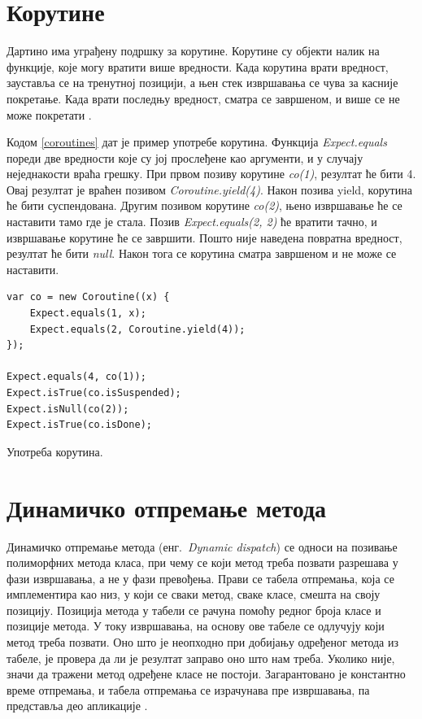 \documentclass[12pt,oneside]{memoir}
\begin{document}
\section{Корутине}
\label{korutine}

Дартино има уграђену подршку за корутине. Корутине су објекти налик на функције, које могу вратити више вредности. Када корутина врати вредност, зауставља се на тренутној позицији, а њен стек извршавања се чува за касније покретање. Када врати последњу вредност, сматра се завршеном, и више се не може покретати  \cite{korutine_i_vlakna}.

Кодом \ref{coroutines} дат је пример употребе корутина. Функција \textit{Expect.equals} пореди две вредности које су јој прослеђене као аргументи, и у случају неједнакости враћа грешку. При првом позиву корутине \textit{co(1)}, резултат ће бити 4. Овај резултат је враћен позивом \textit{Coroutine.yield(4)}. Након позива yield, корутина ће бити суспендована. Другим позивом корутине \textit{co(2)}, њено извршавање ће се наставити тамо где је стала. Позив \textit{Expect.equals(2, 2)} ће вратити тачно, и извршавање корутине ће се завршити. Пошто није наведена повратна вредност, резултат ће бити \textit{null}. Након тога се корутина сматра завршеном и не може се наставити.

\begin{listing}
\begin{verbatim}
var co = new Coroutine((x) {
    Expect.equals(1, x);
    Expect.equals(2, Coroutine.yield(4));
});

Expect.equals(4, co(1));
Expect.isTrue(co.isSuspended);
Expect.isNull(co(2));
Expect.isTrue(co.isDone);
\end{verbatim}
\caption{Употреба корутина.}
\label{coroutines}
\end{listing}

\section{Динамичко отпремање метода}
\label{sec:otpremanje}

Динамичко отпремање метода (енг.~\textit{Dynamic dispatch}) се односи на позивање полиморфних метода класа, при чему се који метод треба позвати разрешава у фази извршавања, а не у фази превођења. Прави се табела отпремања, која се имплементира као низ, у који се сваки метод, сваке класе, смешта на своју позицију. Позиција метода у табели се рачуна помоћу редног броја класе и позиције метода. У току извршавања, на основу ове табеле се одлучују који метод треба позвати. Оно што је неопходно при добијању одређеног метода из табеле, је провера да ли је резултат заправо оно што нам треба. Уколико није, значи да тражени метод одређене класе не постоји. Загарантовано је константно време отпремања, и табела отпремања се израчунава пре извршавања, па представља део апликације \cite{Dartino}.
\end{document}
